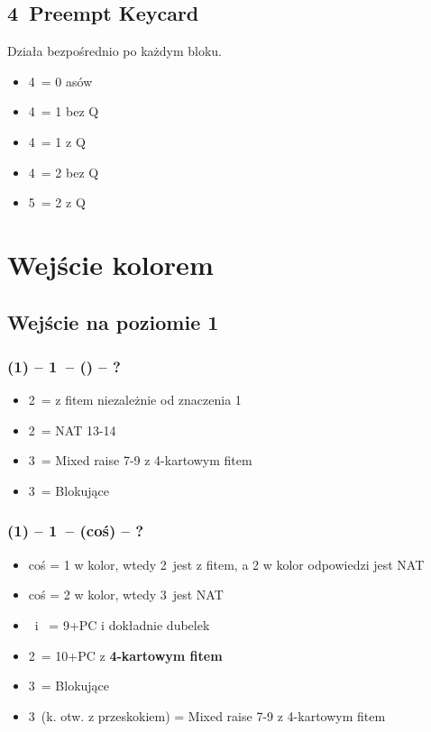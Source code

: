 \documentclass[12pt, a4paper]{article}
\begin{document}
\subsection*{4\clubs\ Preempt Keycard \vimp} 
Działa bezpośrednio po każdym bloku.
\begin{itemize}
    \item 4\diams\ = 0 asów
    \item 4\hearts\ = 1 bez Q
    \item 4\spades\ = 1 z Q
    \item 4\nt\ = 2 bez Q
    \item 5\clubs\ = 2 z Q
\end{itemize}


\pagebreak
\section{Wejście kolorem}
\subsection*{Wejście na poziomie 1}
\subsubsection*{(1\clubs) -- 1\hearts\ -- (\passx) -- ?}
\begin{itemize}
    \item 2\clubs\ = z fitem niezależnie od znaczenia 1\clubs
    \item 2\nt\ = NAT 13-14 \imp
    \item 3\clubs\ = Mixed raise 7-9 z 4-kartowym fitem
    \item 3\hearts\ = Blokujące
\end{itemize}

\subsubsection*{(1\clubs) -- 1\hearts\ -- (coś) -- ?}
\begin{itemize}
    \item coś = 1 w kolor, wtedy 2\clubs\ jest z fitem, a 2 w kolor odpowiedzi jest NAT
    \item coś = 2 w kolor, wtedy 3\clubs\ jest NAT
    \item \dbl\ i \rdbl\ = 9+PC i dokładnie dubelek \hearts
    \item 2\nt\ = 10+PC z \textbf{4-kartowym fitem} \imp
    \item 3\hearts\ = Blokujące
    \item 3\clubs\ (k. otw. z przeskokiem) = Mixed raise 7-9 z 4-kartowym fitem
\end{itemize}
\end{document}
